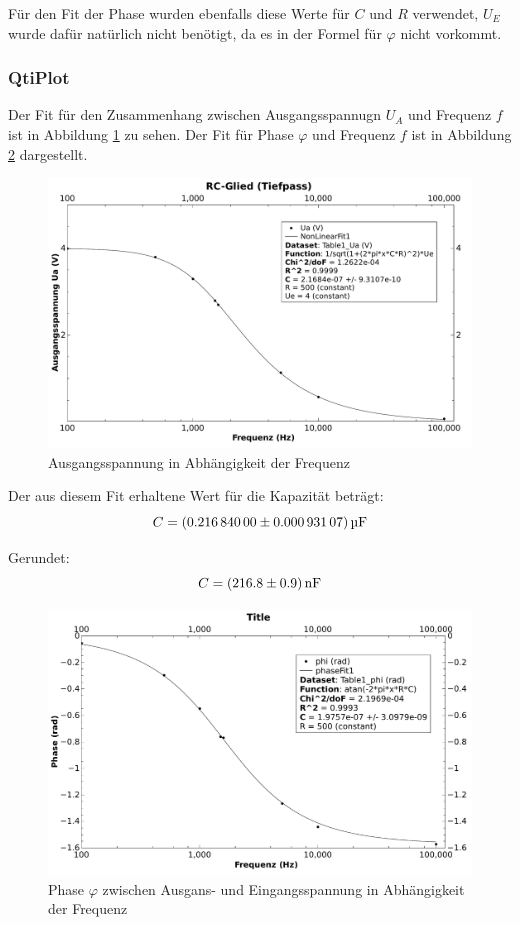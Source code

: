 F\"ur  den Fit  der  Phase wurden  ebenfalls  diese Werte  f\"ur  $C$ und  $R$
verwendet,  $U_E$ wurde  daf\"ur nat\"urlich  nicht ben\"otigt,  da es  in der
Formel f\"ur $\varphi$ nicht vorkommt.

\clearpage
\subsubsection{QtiPlot}

Der Fit  f\"ur den Zusammenhang  zwischen Ausgangsspannugn $U_A$  und Frequenz
$f$  ist  in  Abbildung  \ref{fig:rcglied:spannung} zu  sehen. Der  Fit  f\"ur
Phase  $\varphi$ und  Frequenz  $f$ ist  in Abbildung  \ref{fig:rcglied:phase}
dargestellt.

\begin{figure}[th!]
    \centering
    \includegraphics[width=.8\textwidth]{images/aufgabe5-betrag.pdf}
    \caption{Ausgangsspannung in Abh\"angigkeit der Frequenz}
    \label{fig:rcglied:spannung}
\end{figure}

Der aus diesem Fit erhaltene Wert f\"ur die Kapazit\"at betr\"agt:
\begin{equation*}
    C = \SI[separate-uncertainty = true]{0.21684 \pm 0.00093107}{\micro\farad}
\end{equation*}

Gerundet:
\begin{equation*}
    C = \SI[separate-uncertainty = true]{216.8 \pm 0.9}{\nano\farad}
\end{equation*}

\begin{figure}[th!]
    \centering
    \includegraphics[width=.8\textwidth]{images/aufgabe5-phase.pdf}
    \caption{Phase $\varphi$ zwischen Ausgans- und Eingangsspannung in Abh\"angigkeit der Frequenz}
    \label{fig:rcglied:phase}
\end{figure}

